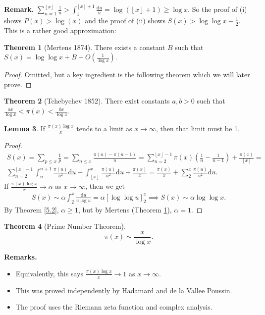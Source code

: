 \documentclass{article}
\theoremstyle{definition}
\newtheorem{theorem}{Theorem}[section]
\newtheorem{lemma}[theorem]{Lemma}
\begin{document}
\textbf{Remark.} $\sum_{n=1}^{\left\lfloor x \right\rfloor} \frac{1}{n} > \int_{1}^{\left\lfloor x \right\rfloor+1} \frac{\mathrm{d}u}{u} = \log(\left\lfloor x \right\rfloor+1) \ge \log x$. So the proof of (i) shows $P(x) > \log(x)$ and the proof of (ii) shows $S(x) > \log \log x - \frac{1}{2}$. This is a rather good approximation:
\begin{theorem}[Mertens 1874]\label{5.3}
    There exists a constant $B$ such that $S(x) = \log \log x + B + O(\frac{1}{\log x})$.
\end{theorem}
\begin{proof}
    Omitted, but a key ingredient is the following theorem which we will later prove.
\end{proof}
\begin{theorem}[Tchebychev 1852]
    There exist constants $a,b >0$ such that $\frac{ax}{\log x} < \pi(x) < \frac{bx}{\log x}$.
\end{theorem}
\begin{lemma}
    If $\frac{\pi(x) \log x}{x}$ tends to a limit as $x \to \infty$, then that limit must be 1.
\end{lemma}
\begin{proof}
    \begin{align*}
        S(x) = \sum_{p\le x}^{} \frac{1}{p} = \sum_{n\le x}^{} \frac{\pi(n)-\pi(n-1)}{n} = \sum_{n=2}^{\left\lfloor x \right\rfloor-1} \pi(x)\left(\frac{1}{n}-\frac{1}{n-1}\right) + \frac{\pi(x)}{\left\lfloor x \right\rfloor} = \\
        \sum_{n=2}^{\left\lfloor x \right\rfloor-1} \int_{n}^{n+1} \frac{\pi(u)}{u^2}\mathrm{d}u + \int_{\left\lfloor x \right\rfloor}^{x} \frac{\pi(u)}{u^2}\mathrm{d}u + \frac{\pi(x)}{x} = \frac{\pi(x)}{x} + \sum_{2}^{x} \frac{\pi(u)}{u^2}\mathrm{d}u.
    \end{align*}
    If $\frac{\pi(x)\log x}{x} \to \alpha$ as $x \to \infty$, then we get 
    \begin{align*}
        S(x) \sim \alpha \int_{2}^{x} \frac{\mathrm{d}u}{u \log u} = \alpha \left[\log \log u \right]_2^x \implies S(x) \sim \alpha \log \log x. 
    \end{align*}
    By Theorem \ref{5.2}, $\alpha\ge 1$, but by Mertens (Theorem \ref{5.3}), $\alpha=1$.
\end{proof}
\begin{theorem}[Prime Number Theorem]
    \[
    \pi(x) \sim \frac{x}{\log x}.
    \]
\end{theorem}
\textbf{Remarks.}
\begin{itemize}
    \item Equivalently, this says $\frac{\pi(x) \log x}{x} \to 1$ as $x \to \infty$.
    \item This was proved independently by Hadamard and de la Vallee Poussin.
    \item The proof uses the Riemann zeta function and complex analysis.
\end{itemize}
\end{document}

